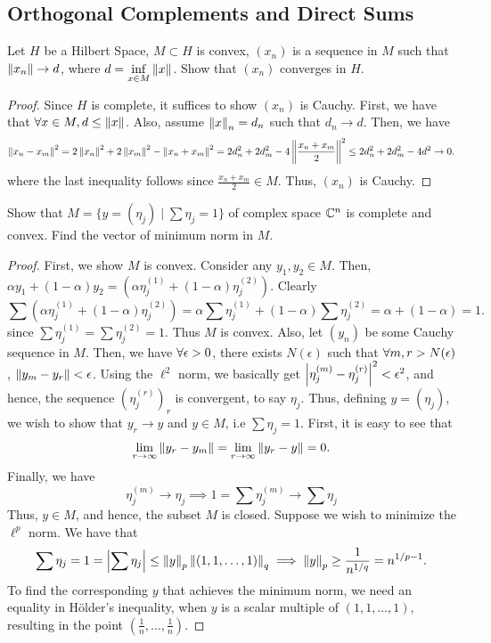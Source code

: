 \subsection{Orthogonal Complements and Direct Sums}

\begin{question}
    Let $H$ be a Hilbert Space, $M \subset H$ is convex, $(x_n)$ is a sequence in $M$ such that $\left\lVert x_n \right\rVert \rightarrow d$, where $d = \inf\limits_{x \in M} \left\lVert x \right\rVert$. Show that $(x_n)$ converges in $H$.
    \label{section3.3-1}
\end{question}
\begin{proof}
    Since $H$ is complete, it suffices to show $(x_n)$ is Cauchy. First, we have that $\forall x \in M, d \leq \left\lVert x \right\rVert$. Also, assume $\left\lVert x \right\rVert_n = d_n$ such that $d_n \rightarrow d$. Then, we have
    \[\left\lVert x_n - x_m \right\rVert^2 = 2\left\lVert x_n \right\rVert^2 + 2\left\lVert x_m \right\rVert^2 - \left\lVert x_n + x_m \right\rVert^2 = 2d_n^2 + 2d_m^2 - 4\left\lVert \frac{x_n + x_m}{2} \right\rVert^2 \leq 2d_n^2 + 2d_m^2 - 4d^2 \rightarrow 0.\]
    where the last inequality follows since $\frac{x_n + x_m}{2} \in M$. Thus, $(x_n)$ is Cauchy.
\end{proof}

\begin{question}
    Show that $M = \{y = (\eta_j) \mid \sum \eta_j = 1\}$ of complex space $\mathbb{C}^n$ is complete and convex. Find the vector of minimum norm in $M$.
    \label{section3.3-2}
\end{question}
\begin{proof}
    First, we show $M$ is convex. Consider any $y_1 , y_2 \in M$. Then, $\alpha y_1 + (1-\alpha) y_2 = (\alpha \eta^{(1)}_j + (1-\alpha) \eta^{(2)}_j)$. Clearly
    \[\sum (\alpha \eta^{(1)}_j + (1-\alpha) \eta^{(2)}_j) = \alpha \sum \eta^{(1)}_j + (1-\alpha) \sum \eta^{(2)}_j = \alpha  + (1-\alpha) = 1.\]
    since $\sum \eta^{(1)}_j = \sum \eta^{(2)}_j = 1$. Thus $M$ is convex. Also, let $(y_n)$ be some Cauchy sequence in $M$. Then, we have $\forall \epsilon > 0$, there exists $N(\epsilon)$ such that $\forall m,r > N(\epsilon)$, $\left\lVert y_m - y_r \right\rVert < \epsilon $. Using the $\ell^2$ norm, we basically get $\left\lvert \eta^{(m)}_j - \eta^{(r)}_j \right\rvert^2 < \epsilon^2$, and hence, the sequence $(\eta_j^{(r)})_r$ is convergent, to say $\eta_j$. Thus, defining $y = (\eta_j)$, we wish to show that $y_r \rightarrow y$ and $y \in M$, i.e $\sum \eta_j = 1$. First, it is easy to see that
    \[\lim_{r \rightarrow \infty} \left\lVert y_r - y_m \right\rVert = \lim_{r \rightarrow \infty} \left\lVert y_r - y \right\rVert = 0.\]
    Finally, we have
    \[\eta^{(m)}_j \rightarrow \eta_j \implies 1 = \sum \eta^{(m)}_j \rightarrow \sum \eta_j\]
    Thus, $y \in M$, and hence, the subset $M$ is closed.
    Suppose we wish to minimize the $\ell^p$ norm. We have that
    \[\sum \eta_j = 1 = \left\lvert \sum \eta_j \right\rvert \leq \left\lVert y \right\rVert_p \left\lVert (1,1,\ldots, 1) \right\rVert_q \implies \left\lVert y \right\rVert_p \geq \frac{1}{n^{1/q}} = n^{1/p - 1}.\]
    To find the corresponding $y$ that achieves the minimum norm, we need an equality in Hölder's inequality, when $y$ is a scalar multiple of $(1,1,\ldots,1)$, resulting in the point $(\frac{1}{n} , \ldots , \frac{1}{n})$.
\end{proof} 

